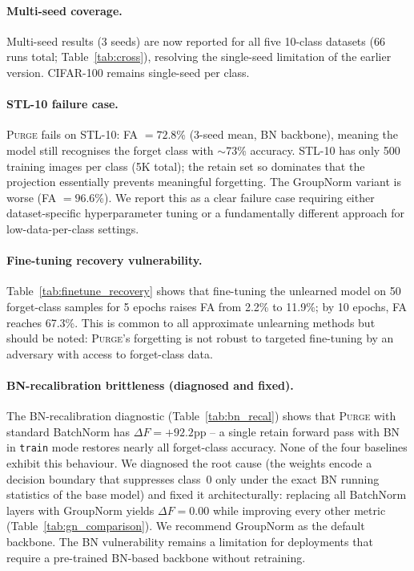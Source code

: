 \documentclass{article}
\newcommand{\ours}{\textsc{Purge}}
\newcommand{\new}[1]{{\color{orange}#1}}
\newcommand{\newpar}[1]{{\color{orange}#1}}
\begin{document}
\new{\paragraph{Multi-seed coverage.}
Multi-seed results (3 seeds) are now reported for all five 10-class datasets (66 runs total; Table~\ref{tab:cross}), resolving the single-seed limitation of the earlier version. CIFAR-100 remains single-seed per class.}

\newpar{\paragraph{STL-10 failure case.}
\ours{} fails on STL-10: FA $= 72.8$\% (3-seed mean, BN backbone), meaning the model still recognises the forget class with $\sim$73\% accuracy. STL-10 has only 500 training images per class (5K total); the retain set so dominates that the projection essentially prevents meaningful forgetting. The GroupNorm variant is worse (FA $= 96.6$\%). We report this as a clear failure case requiring either dataset-specific hyperparameter tuning or a fundamentally different approach for low-data-per-class settings.}

\newpar{\paragraph{Fine-tuning recovery vulnerability.}
Table~\ref{tab:finetune_recovery} shows that fine-tuning the unlearned model on 50 forget-class samples for 5 epochs raises FA from 2.2\% to 11.9\%; by 10 epochs, FA reaches 67.3\%. This is common to all approximate unlearning methods but should be noted: \ours{}'s forgetting is not robust to targeted fine-tuning by an adversary with access to forget-class data.}

\paragraph{\new{BN-recalibration brittleness (diagnosed and fixed).}}
\new{The BN-recalibration diagnostic (Table~\ref{tab:bn_recal}) shows that \ours{} with standard BatchNorm has $\Delta F = +92.2$pp -- a single retain forward pass with BN in \texttt{train} mode restores nearly all forget-class accuracy. None of the four baselines exhibit this behaviour. We diagnosed the root cause (the weights encode a decision boundary that suppresses class~0 only under the exact BN running statistics of the base model) and fixed it architecturally: replacing all BatchNorm layers with GroupNorm yields $\Delta F = 0.00$ while improving every other metric (Table~\ref{tab:gn_comparison}). We recommend GroupNorm as the default backbone. The BN vulnerability remains a limitation for deployments that require a pre-trained BN-based backbone without retraining.}
\end{document}
